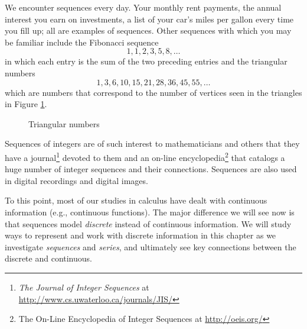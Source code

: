 We encounter sequences every day. Your monthly rent payments, the annual interest you earn on investments, a list of your car's miles per gallon every time you fill up; all are examples of sequences. Other sequences with which you may be familiar include the Fibonacci sequence
\[1, 1, 2, 3, 5, 8, \ldots\]
in which each entry is the sum of the two preceding entries and the triangular numbers
\[1, 3, 6, 10, 15, 21, 28, 36, 45, 55, \ldots\]
which are numbers that correspond to the number of vertices seen in the triangles in Figure \ref{F:8.1.Triangular_numbers}.
\begin{figure}[h]
\begin{center}
\caption{Triangular numbers}
\label{F:8.1.Triangular_numbers}
\end{center}
\end{figure}
Sequences of integers are of such interest to mathematicians and others that they have a journal\footnote{\emph{The Journal of Integer Sequences} at \url{http://www.cs.uwaterloo.ca/journals/JIS/}} devoted to them and an on-line encyclopedia\footnote{The On-Line Encyclopedia of Integer Sequences at \url{http://oeis.org/}} that catalogs a huge number of integer sequences and their connections. Sequences are also used in digital recordings and digital images. 

To this point, most of our studies in calculus have dealt with continuous information (e.g., continuous functions). The major difference we will see now is that sequences model \emph{discrete} instead of continuous information. We will study ways to represent and work with discrete information in this chapter as we investigate \emph{sequences} and \emph{series}, and ultimately see key connections between the discrete and continuous.


